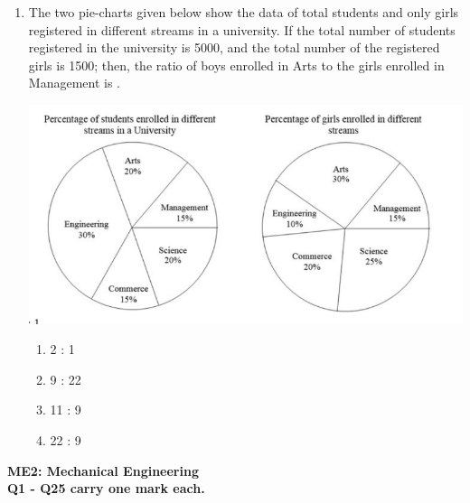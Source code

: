 \documentclass[12pt,onecolumn]{article}
\begin{document}
\begin{enumerate}
    \item The two pie-charts given below show the data of total students and only girls registered in different streams in a university. If the total number of students registered in the university is 5000, and the total number of the registered girls is 1500; then, the ratio of boys enrolled in Arts to the girls enrolled in Management is \underline{\hspace{2cm}}.
          \begin{center}
              \includegraphics[scale=0.5]{q10s2}
          \end{center}
          \begin{enumerate}
              \item 2 : 1
              \item 9 : 22
              \item 11 : 9
              \item 22 : 9
          \end{enumerate}
\end{enumerate}
\noindent\large\textbf{ME2: Mechanical Engineering}\\
\normalsize\textbf{Q1 - Q25 carry one mark each.}
\end{document}

